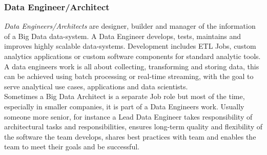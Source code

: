 \subsubsection{Data Engineer/Architect}
\label{bd_bdib_roles_de}
\textit{Data Engineers/Architects} are designer, builder and manager of the information of a Big Data data-system. A Data Engineer develops, tests, maintains and improves highly scalable data-systems. Development includes ETL Jobs, custom analytics applications or custom software components for standard analytic tools. A data engineers work is all about collecting, transforming and storing data, this can be achieved using batch processing or real-time streaming, with the goal to serve analytical use cases, applications and data scientists.
\\Sometimes a Big Data Architect is a separate Job role but most of the time, especially in smaller companies, it is part of a Data Engineers work. Usually someone more senior, for instance a Lead Data Engineer takes responsibility of architectural tasks and responsibilities, ensures long-term quality and flexibility of the software the team develops, shares best practices with team and enables the team to meet their goals and be successful.\\
